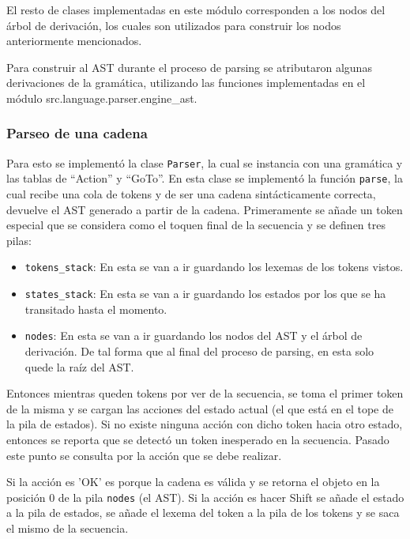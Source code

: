 El resto de clases implementadas en este m\'odulo corresponden a los nodos del \'arbol de derivaci\'on, los cuales son utilizados para construir los nodos anteriormente mencionados.

Para construir al AST durante el proceso de parsing se atributaron algunas derivaciones de la gram\'atica, utilizando las funciones implementadas en el m\'odulo src.language.parser.engine\_ast.

\subsubsection{Parseo de una cadena}

Para esto se implement\'o la clase \verb|Parser|, la cual se instancia con una gram\'atica y las tablas de ``Action'' y ``GoTo''. En esta clase se implement\'o la funci\'on \verb|parse|, la cual recibe una cola de tokens y de ser una cadena sint\'acticamente correcta, devuelve el AST generado a partir de la cadena. Primeramente se a\~{n}ade un token especial que se considera como el toquen final de la secuencia y se definen tres pilas:

\begin{itemize}
	\item \verb|tokens_stack|: En esta se van a ir guardando los lexemas de los tokens vistos.
	\item \verb|states_stack|: En esta se van a ir guardando los estados por los que se ha transitado hasta el momento.
	\item \verb|nodes|: En esta se van a ir guardando los nodos del AST y el \'arbol de derivaci\'on. De tal forma que al final del proceso de parsing, en esta solo quede la ra\'iz del AST.
\end{itemize}

Entonces mientras queden tokens por ver de la secuencia, se toma el primer token de la misma y se cargan las acciones del estado actual (el que est\'a en el tope de la pila de estados). Si no existe ninguna acci\'on con dicho token hacia otro estado, entonces se reporta que se detect\'o un token inesperado en la secuencia. Pasado este punto se consulta por la acci\'on que se debe realizar. 

Si la acci\'on es 'OK' es porque la cadena es v\'alida y se retorna el objeto en la posici\'on 0 de la pila \verb|nodes| (el AST). Si la acci\'on es hacer Shift se a\~{n}ade el estado a la pila de estados, se a\~{n}ade el lexema del token a la pila de los tokens y se saca el mismo de la secuencia.

